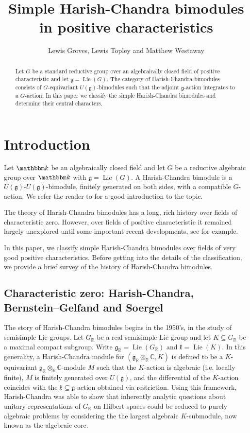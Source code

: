 \documentclass[twoside,12pt,reqno]{amsart}
\title{\boldmath Simple Harish-Chandra bimodules in positive characteristics}
\author{Lewis Groves, Lewis Topley and Matthew Westaway}
\theoremstyle{remark}
\numberwithin{equation}{section}
\def\k{{\mathbbm k}}
\def\R{\mathbb{R}}
\def\Lie{\operatorname{Lie}}
\def\C{{\mathbb C}}
\def\g{{\mathfrak g}}
\def\kk{\mathfrak{k}}
\begin{document}
    \begin{abstract}
    Let $G$ be a standard reductive group over an algebraically closed field of positive characteristic and let $\g = \operatorname{Lie}(G)$. The category of Harish-Chandra bimodules consists of $G$-equivariant $U(\g)$-bimodules such that the adjoint $\g$-action integrates to a $G$-action. In this paper we classify the simple Harish-Chandra bimodules and determine their central characters.
    \end{abstract}
	
	\maketitle



\section{Introduction}

Let $\k$ be an algebraically closed field and let $G$ be a reductive algebraic group over $\k$ with $\g=\Lie(G)$. A Harish-Chandra bimodule 
is a $U(\g)$-$U(\g)$-bimodule, finitely generated on both sides, with a compatible $G$-action. We refer the reader to \cite{Et} for a good introduction to the topic.

The theory of Harish-Chandra bimodules has a long, rich history over fields of characteristic zero. However, over fields of positive characteristic it remained largely unexplored until some important recent developments, see \cite{BR, BR2, Lo} for example.

In this paper, we classify simple Harish-Chandra bimodules over fields of very good positive characteristics. Before getting into the details of the classification, we provide a brief survey of the history of Harish-Chandra bimodules.

\subsection{Characteristic zero: Harish-Chandra, Bernstein--Gelfand and Soergel}

The story of Harish-Chandra bimodules begins in the 1950's, in the study of semisimple Lie groups. Let $G_\R$ be a real semisimple Lie group and let $K \subseteq G_\R$ be a maximal compact subgroup. Write $\g_\R=\Lie(G_\R)$ and $\kk=\Lie(K)$. In this generality, a Harish-Chandra module for $(\g_\R\otimes_\R\C,K)$ is defined to be a $K$-equivariant $\g_\R \otimes_\R \C$-module $M$ such that the $K$-action is algebraic (i.e. locally finite), $M$ is finitely generated over $U(\g)$, and the differential of the $K$-action coincides with the $\kk \subseteq \g$-action obtained via restriction. Using this framework, Harish-Chandra was able to show that inherently analytic questions about unitary representations of $G_\R$ on Hilbert spaces could be reduced to purely algebraic problems by considering the the largest algebraic $K$-submodule, now known as the algebraic core.
\end{document}
